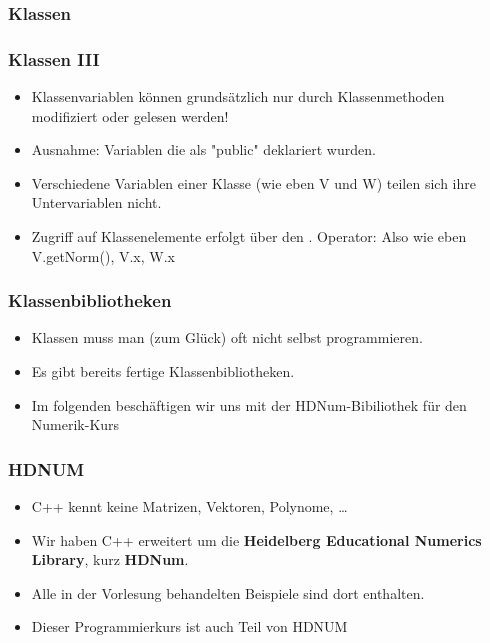 \documentclass[ignorenonframetext,12pt]{beamer}
\theoremstyle{definition}
\theoremstyle{definition}
\begin{document}
\begin{frame}
\frametitle{Klassen}

\end{frame}



\begin{frame}[fragile]
\frametitle{Klassen III}
\begin{itemize}
\item Klassenvariablen können grundsätzlich nur durch Klassenmethoden modifiziert oder gelesen werden!
\item Ausnahme: Variablen die als "public" deklariert wurden.
\item Verschiedene Variablen einer Klasse (wie eben V und W) teilen sich ihre Untervariablen nicht.
\item Zugriff auf Klassenelemente erfolgt über den . Operator: Also wie eben V.getNorm(), V.x, W.x
\end{itemize}
\end{frame}

\begin{frame}[fragile]
\frametitle{Klassenbibliotheken}
\begin{itemize}
\item Klassen muss man (zum Glück) oft nicht selbst programmieren.
\item Es gibt bereits fertige Klassenbibliotheken.
\item Im folgenden beschäftigen wir uns mit der HDNum-Bibiliothek für den Numerik-Kurs
\end{itemize}
\end{frame}

\begin{frame}[fragile]
\frametitle{HDNUM}
\begin{itemize}
\item C++ kennt keine Matrizen, Vektoren, Polynome, \ldots
\item Wir haben C++ erweitert um die \textbf{Heidelberg Educational
  Numerics Library}, kurz \textbf{HDNum}.
\item Alle in der Vorlesung behandelten Beispiele sind dort
  enthalten.
\item Dieser Programmierkurs ist auch Teil von HDNUM
\end{itemize}
\end{frame}
\end{document}
